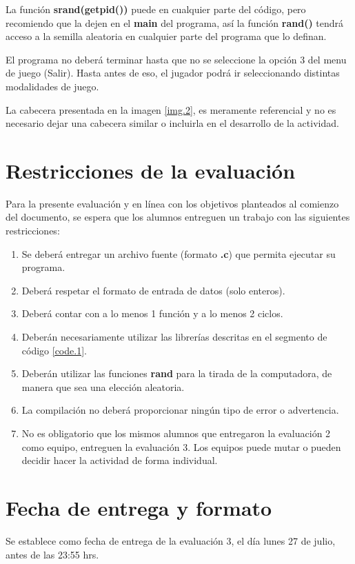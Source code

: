 \documentclass[]{article}
\begin{document}
    La función \textbf{srand(getpid())} puede en cualquier parte del código, pero recomiendo que la dejen en el \textbf{main} del programa, así la función \textbf{rand()} tendrá acceso a la semilla aleatoria en cualquier parte del programa que lo definan.

    El programa no deberá terminar hasta que no se seleccione la opción 3 del menu de juego (Salir). Hasta antes de eso, el jugador podrá ir seleccionando distintas modalidades de juego.

    La cabecera presentada en la imagen \ref{img.2}, es meramente referencial y no es necesario dejar una cabecera similar o incluirla en el desarrollo de la actividad.

    \section{Restricciones de la evaluación}
    Para la presente evaluación y en línea con los objetivos planteados al comienzo del documento, se espera que los alumnos entreguen un trabajo con las siguientes restricciones:

    \begin{enumerate}
        \item Se deberá entregar un archivo fuente (formato \textbf{.c}) que permita ejecutar su programa.
        \item Deberá respetar el formato de entrada de datos (solo enteros).
        \item Deberá contar con a lo menos 1 función y a lo menos 2 ciclos.
        \item Deberán necesariamente utilizar las librerías descritas en el segmento de código \ref{code.1}.
        \item Deberán utilizar las funciones \textbf{rand} para la tirada de la computadora, de manera que sea una elección aleatoria.
        \item La compilación no deberá proporcionar ningún tipo de error o advertencia.
        \item No es obligatorio que los mismos alumnos que entregaron la evaluación 2 como equipo, entreguen la evaluación 3. Los equipos puede mutar o pueden decidir hacer la actividad de forma individual.
    \end{enumerate}

    \section{Fecha de entrega y formato}
    Se establece como fecha de entrega de la evaluación 3, el día lunes 27 de julio, antes de las 23:55 hrs.
    
\end{document}
